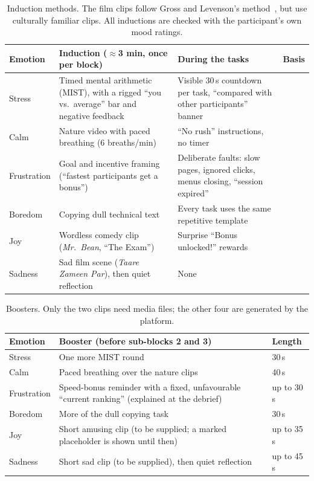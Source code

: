 \documentclass[11pt,a4paper]{article}
\begin{document}
\begin{table}[H]
\centering\small
\begin{tabularx}{\linewidth}{@{}l L L l@{}}
\toprule
\textbf{Emotion} & \textbf{Induction ($\approx$3 min, once per block)} & \textbf{During the tasks} & \textbf{Basis}\\
\midrule
Stress & Timed mental arithmetic (MIST), with a rigged ``you vs.\ average'' bar and negative feedback & Visible 30\,s countdown per task, ``compared with other participants'' banner & \cite{dedovic2005,kirschbaum1993}\\
Calm & Nature video with paced breathing (6 breaths/min) & ``No rush'' instructions, no timer & \cite{ulrich1991,lehrer2014}\\
Frustration & Goal and incentive framing (``fastest participants get a bonus'') & Deliberate faults: slow pages, ignored clicks, menus closing, ``session expired'' & \cite{scheirer2002,ceaparu2004}\\
Boredom & Copying dull technical text & Every task uses the same repetitive template & \cite{vantilburg2012,markey2014}\\
Joy & Wordless comedy clip (\emph{Mr.\ Bean}, ``The Exam'') & Surprise ``Bonus unlocked!'' rewards & \cite{gross1995,isen1972}\\
Sadness & Sad film scene (\emph{Taare Zameen Par}), then quiet reflection & None & \cite{gross1995}\\
\bottomrule
\end{tabularx}
\caption{Induction methods. The film clips follow Gross and Levenson's method~\cite{gross1995}, but use culturally familiar clips. All inductions are checked with the participant's own mood ratings.}
\end{table}

\begin{table}[H]
\centering\small
\begin{tabularx}{\linewidth}{@{}l L l@{}}
\toprule
\textbf{Emotion} & \textbf{Booster (before sub-blocks 2 and 3)} & \textbf{Length}\\
\midrule
Stress & One more MIST round & 30\,s\\
Calm & Paced breathing over the nature clips & 40\,s\\
Frustration & Speed-bonus reminder with a fixed, unfavourable ``current ranking'' (explained at the debrief) & up to 30\,s\\
Boredom & More of the dull copying task & 30\,s\\
Joy & Short amusing clip (to be supplied; a marked placeholder is shown until then) & up to 35\,s\\
Sadness & Short sad clip (to be supplied), then quiet reflection & up to 45\,s\\
\bottomrule
\end{tabularx}
\caption{Boosters. Only the two clips need media files; the other four are generated by the platform.}
\label{tab:boosters}
\end{table}
\end{document}
